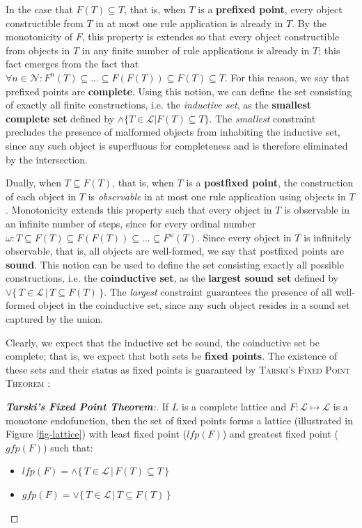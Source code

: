 In the case that $F(T) \subseteq T$, that is, when $T$ is a \textbf{prefixed point}, every object constructible from $T$ in at most one rule application is already in $T$. By the monotonicity of $F$, this property is extendes so that every object constructible from objects in $T$ in any finite number of rule applications is already in $T$; this fact emerges from the fact that $\forall n \in \mathcal{N}: F^{n}(T) \subseteq ... \subseteq F(F(T)) \subseteq F(T) \subseteq T$. For this reason, we say that prefixed points are \textbf{complete}. Using this notion, we can define the set consisting of exactly all finite constructions, i.e. the \textit{inductive set}, as the \textbf{smallest complete set} defined by $\wedge \{ T \in \mathcal{L}| F(T) \subseteq T \}$. The \textit{smallest} constraint precludes the presence of malformed objects from inhabiting the inductive set, since any such object is superfluous for completeness and is therefore eliminated by the intersection.

Dually, when $T \subseteq F(T)$, that is, when $T$ is a \textbf{postfixed point}, the construction of each object in $T$ is \textit{observable} in at most one rule application using objects in $T$. Monotonicity extends this property such that every object in $T$ is observable in an infinite number of steps, since for every ordinal number $\omega: T \subseteq F(T) \subseteq F(F(T)) \subseteq ... \subseteq F^{\omega}(T)$. Since every object in $T$ is infinitely observable, that is, all objects are well-formed, we say that postfixed points are \textbf{sound}. This notion can be used to define the set consisting exactly all possible constructions, i.e. the \textbf{coinductive set}, as the \textbf{largest sound set} defined by $\vee \{\, T \in \mathcal{L}\,|\, T \subseteq F(T) \,\}$. The \textit{largest} constraint guarantees the presence of all well-formed object in the coinductive set, since any such object resides in a sound set captured by the union.

Clearly, we expect that the inductive set be sound, the coinductive set be complete; that is, we expect that both sets be \textbf{fixed points}. The existence of these sets and their status as fixed points is guaranteed by \textsc{Tarski's Fixed Point Theorem} \cite{Sangiorgi2011}:

\begin{proof}[\textbf{Tarski's Fixed Point Theorem}:]
If $L$ is a complete lattice and $F: \mathcal{L} \mapsto \mathcal{L}$ is a monotone endofunction, then the set of fixed points forms a lattice (illustrated in Figure \ref{fig-lattice}) with least fixed point ($lfp(F)$) and greatest fixed point ($gfp(F)$) such that:
\begin{itemize}
\item $lfp(F) = \wedge \{\, T \in \mathcal{L} \,|\, F(T) \subseteq T \,\}$ 
\item $gfp(F) = \vee \{\, T \in \mathcal{L} \,|\, T \subseteq F(T) \,\}$
\end{itemize}
\end{proof}

